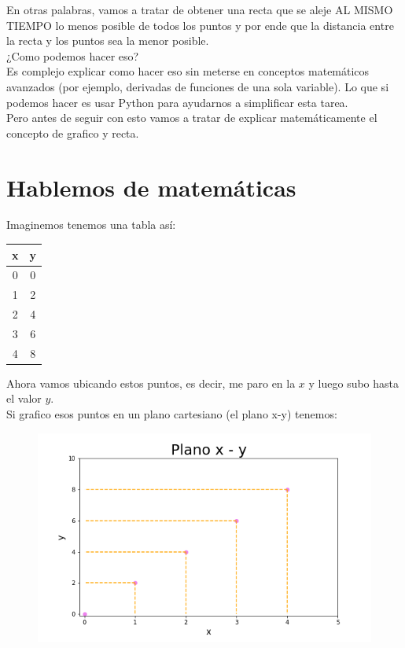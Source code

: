 \documentclass{article}
\begin{document}
En otras palabras, vamos a tratar de obtener una recta que se aleje AL MISMO TIEMPO lo menos posible de todos los puntos y por ende que la distancia entre la recta y los puntos sea la menor posible.\\
¿Como podemos hacer eso?\\
Es complejo explicar como hacer eso sin meterse en conceptos matemáticos avanzados (por ejemplo, derivadas de funciones de una sola variable). Lo que si podemos hacer es usar Python para ayudarnos a simplificar esta tarea.\\
 Pero antes de seguir con esto vamos a tratar de explicar matemáticamente el concepto de grafico y recta.

\section{Hablemos de matemáticas}
Imaginemos tenemos una tabla así:
\begin{center}
 \begin{tabular}{|c | c|} 
 \hline
 x & y \\
 \hline
 0 & 0 \\ 
 \hline
 1 & 2 \\
 \hline
 2 & 4 \\
 \hline
 3 & 6 \\
 \hline
 4 & 8 \\ [1ex] 
 \hline
\end{tabular}
\end{center}
Ahora vamos ubicando estos puntos, es decir, me paro en la $x$ y luego subo hasta el valor $y$.\\
Si grafico esos puntos en un plano cartesiano (el plano x-y) tenemos:\\
\begin{figure}[h!]
\includegraphics[scale=0.5]{Imagenes/plano_x_y.png}
\centering
\end{figure}
\end{document}
